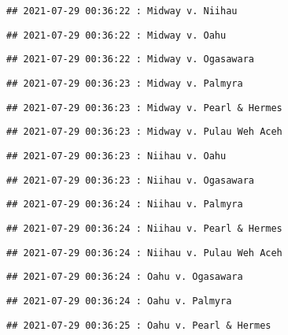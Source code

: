 \documentclass[
]{article}
\begin{document}
\begin{verbatim}
## 2021-07-29 00:36:22 : Midway v. Niihau
\end{verbatim}

\begin{verbatim}
## 2021-07-29 00:36:22 : Midway v. Oahu
\end{verbatim}

\begin{verbatim}
## 2021-07-29 00:36:22 : Midway v. Ogasawara
\end{verbatim}

\begin{verbatim}
## 2021-07-29 00:36:23 : Midway v. Palmyra
\end{verbatim}

\begin{verbatim}
## 2021-07-29 00:36:23 : Midway v. Pearl & Hermes
\end{verbatim}

\begin{verbatim}
## 2021-07-29 00:36:23 : Midway v. Pulau Weh Aceh
\end{verbatim}

\begin{verbatim}
## 2021-07-29 00:36:23 : Niihau v. Oahu
\end{verbatim}

\begin{verbatim}
## 2021-07-29 00:36:23 : Niihau v. Ogasawara
\end{verbatim}

\begin{verbatim}
## 2021-07-29 00:36:24 : Niihau v. Palmyra
\end{verbatim}

\begin{verbatim}
## 2021-07-29 00:36:24 : Niihau v. Pearl & Hermes
\end{verbatim}

\begin{verbatim}
## 2021-07-29 00:36:24 : Niihau v. Pulau Weh Aceh
\end{verbatim}

\begin{verbatim}
## 2021-07-29 00:36:24 : Oahu v. Ogasawara
\end{verbatim}

\begin{verbatim}
## 2021-07-29 00:36:24 : Oahu v. Palmyra
\end{verbatim}

\begin{verbatim}
## 2021-07-29 00:36:25 : Oahu v. Pearl & Hermes
\end{verbatim}
\end{document}
